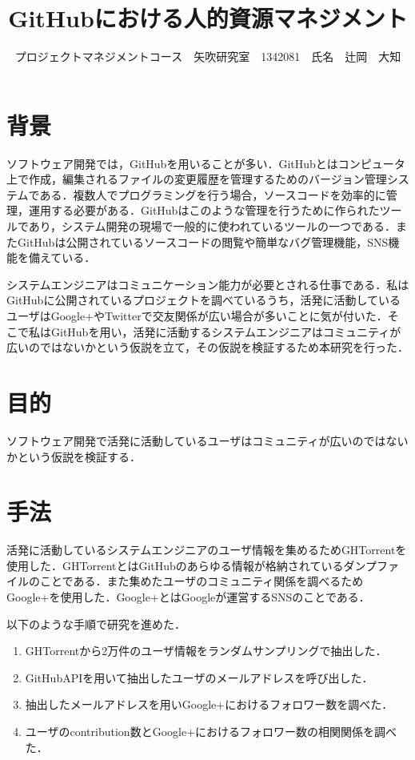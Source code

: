 \documentclass[uplatex,twocolumn,dvipdfmx]{jsarticle}
\title{\vspace{-5mm}\fontsize{14pt}{0pt}\selectfont GitHubにおける人的資源マネジメント}
\author{\normalsize プロジェクトマネジメントコース　矢吹研究室　1342081　氏名　辻岡　大知}
\date{}
\begin{document}
\fontsize{10.5pt}{\baselineskip}\selectfont
\maketitle





\section{背景}

ソフトウェア開発では，GitHubを用いることが多い．GitHubとはコンピュータ上で作成，編集されるファイルの変更履歴を管理するためのバージョン管理システムである．複数人でプログラミングを行う場合，ソースコードを効率的に管理，運用する必要がある．GitHubはこのような管理を行うために作られたツールであり，システム開発の現場で一般的に使われているツールの一つである\cite{a}．またGitHubは公開されているソースコードの閲覧や簡単なバグ管理機能，SNS機能を備えている．

システムエンジニアはコミュニケーション能力が必要とされる仕事である．私はGitHubに公開されているプロジェクトを調べているうち，活発に活動しているユーザはGoogle+やTwitterで交友関係が広い場合が多いことに気が付いた．そこで私はGitHubを用い，活発に活動するシステムエンジニアはコミュニティが広いのではないかという仮説を立て，その仮説を検証するため本研究を行った．


\section{目的}

ソフトウェア開発で活発に活動しているユーザはコミュニティが広いのではないかという仮説を検証する．

\section{手法}

活発に活動しているシステムエンジニアのユーザ情報を集めるためGHTorrentを使用した．GHTorrentとはGitHubのあらゆる情報が格納されているダンプファイルのことである．また集めたユーザのコミュニティ関係を調べるためGoogle+を使用した．Google+とはGoogleが運営するSNSのことである．

以下のような手順で研究を進めた．

\begin{enumerate}
 \item GHTorrentから2万件のユーザ情報をランダムサンプリングで抽出した．
 \item GitHubAPIを用いて抽出したユーザのメールアドレスを呼び出した．
 \item 抽出したメールアドレスを用いGoogle+におけるフォロワー数を調べた．
 \item ユーザのcontribution数とGoogle+におけるフォロワー数の相関関係を調べた．
\end{enumerate}
\end{document}
